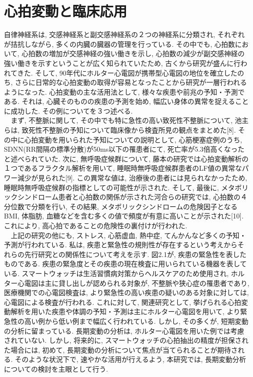 \documentclass[report, 11pt, a4paper]{jsbook}
\begin{document}
\section{心拍変動と臨床応用}
自律神経系は, 交感神経系と副交感神経系の２つの神経系に分類され, それぞれが拮抗しながら, 多くの内臓の臓器の管理を行っている. その中でも, 心拍数において, 心拍数の増加が交感神経の強い働きを示し, 心拍数の減少が副交感神経の強い働きを示すということが広く知られていたため, 古くから研究が盛んに行われてきた. そして, 90年代にホルター心電図が携帯型心電図の地位を確立したのち, さらに日常的な心拍変動の取得が容易となったことから研究が一層行われるようになった. 心拍変動の主な活用法として, 様々な疾患や前兆の予知・予測である. それは, 心臓そのものの疾患の予測を始め, 幅広い身体の異常を捉えることに成功した. その例についてを３つ述べる. \\
　まず,  不整脈に関して, その中でも特に急性の高い致死性不整脈について, 池主らは, 致死性不整脈の予知について臨床像から検査所見の観点をまとめた[8]. その中に心拍変動を用いられた予知についての説明として, 心筋梗塞症例のうち, SDNN(RR間隔の標準分散)が50ms以下の罹患者にて, 死亡率が5.3倍高くなったと述べられていた. 次に, 無呼吸症候群について, 藤本の研究では心拍変動解析の１つであるフラクタル解析を用いて, 睡眠時無呼吸症候群患者のLF値の異常なパワー減少が見られた[9]. この異常な値は, 治療後の患者には見られなかったため, 睡眠時無呼吸症候群の指標としての可能性が示された. そして, 最後に, メタボリックシンドローム患者と心拍数の関係が示された河合らの研究では, 心拍数の４分位数で分類を行い, その結果, メタボリックシンドロームの危険因子となるBMI, 体脂肪, 血糖などを含む多くの値で頻度が有意に高いことが示された[10]. これにより, 高心拍であることの危険性の裏付けが行われた.\\
　上記の研究の他にも, ストレス, 心筋虚血, 熱中症, てんかんなど多くの予知・予測が行われている. 私は, 疾患と緊急性の規則性が存在するという考えからそれらの先行研究との関係性について考えを示す. 図2.1が, 疾患の緊急性を表したものである. 疾患の緊急度とその疾患の現在検査に用いられている機器を表している. スマートウォッチは生活習慣病対策からヘルスケアのため使用され, ホルター心電図は主に貸し出しが認められる対象が, 不整脈や狭心症の罹患者であり, 医療機関での心電図検査は, より緊急性の高い疾患の疑いのある対象に対しては, 心電図による検査が行われる. これに対して, 関連研究として, 挙げられる心拍変動解析を用いた疾患や体調の予知・予測は主にホルター心電図を用いて, より緊急性の高い例から低い例まで幅広く行われている. しかし, その多くが, 短期変動の分析に留まっている. 長期変動の分析は, ホルター心電図を用いた例では考慮されていない. しかし, 将来的に, スマートウォッチの心拍抽出の精度が担保された場合には, 初めて, 長期変動の分析について焦点が当てられることが期待される. そのような状況下で, 速やかな活用が行えるよう, 本研究では, 長期変動分析についての検討を主眼として行う. 
\end{document}
